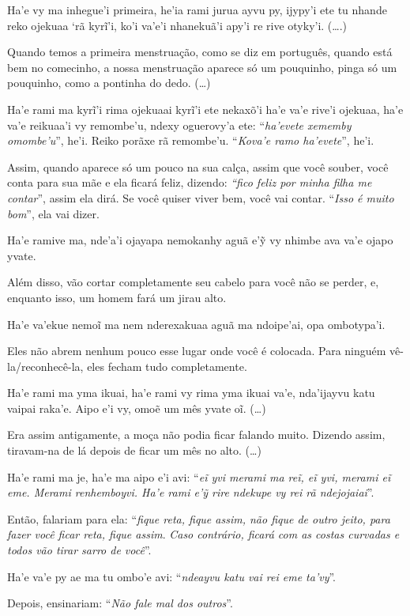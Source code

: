 \begin{paracol}{2}
\footnotesize
Ha’e vy ma inhegue’i primeira, he’ia rami jurua ayvu py, ijypy’i ete tu
nhande reko ojekuaa ‘rã kyrĩ’i, ko’i va’e’i nhanekuã’i apy’i re rive
otyky’i. (\ldots{}.)

\switchcolumn
Quando temos a primeira menstruação, como se diz em português, quando
está bem no comecinho, a nossa menstruação aparece só um pouquinho,
pinga só um pouquinho, como a pontinha do dedo. (\ldots{})

\switchcolumn
Ha'e rami ma kyrĩ'i rima ojekuaai kyrĩ'i ete nekaxõ'i ha'e va'e rive'i
ojekuaa, ha'e va'e reikuaa'i vy remombe'u, ndexy oguerovy'a ete:
``\emph{ha'evete xememby omombe'u}'', he'i. Reiko porãxe rã remombe'u.
``\emph{Kova'e ramo ha'evete}'', he'i.

\switchcolumn
Assim, quando aparece só um pouco na sua calça, assim que você souber,
você conta para sua mãe e ela ficará feliz, dizendo: \emph{``fico feliz
por minha filha me contar}'', assim ela dirá. Se você quiser viver bem,
você vai contar. ``\emph{Isso é muito bom}'', ela vai dizer.

\switchcolumn
Ha'e ramive ma, nde'a'i ojayapa nemokanhy aguã e'ỹ vy nhimbe ava va'e
ojapo yvate.

\switchcolumn
Além disso, vão cortar completamente seu cabelo para você não se perder,
e, enquanto isso, um homem fará um jirau alto. 

\switchcolumn
Ha’e va’ekue nemoĩ ma nem nderexakuaa aguã ma ndoipe’ai, opa
ombotypa’i. 

\switchcolumn
Eles não abrem nenhum pouco esse lugar onde você é colocada. Para
ninguém vê-la/reconhecê-la, eles fecham tudo completamente.

\switchcolumn
Ha’e rami ma yma ikuai, ha’e rami vy rima yma ikuai va’e, nda’ijayvu
katu vaipai raka’e.
Aipo e'i vy, omoẽ um mês yvate oĩ. (\ldots{})

\switchcolumn
Era assim antigamente, a moça não podia ficar falando muito. Dizendo
assim, tiravam-na de lá depois de ficar um mês no alto. (\ldots{})

\switchcolumn
Ha'e rami ma je, ha'e ma aipo e'i avi: ``\emph{eĩ yvi merami ma reĩ, eĩ
yvi, merami eĩ eme. Merami renhemboyvi. Ha'e rami e'ỹ rire ndekupe vy
rei rã ndejojaiai}''. 

\switchcolumn
Então, falariam para ela: ``\emph{fique reta, fique assim, não fique de
outro jeito, para fazer você ficar reta, fique assim}. \emph{Caso
contrário, ficará com as costas curvadas e todos vão tirar sarro de
você}''.

\switchcolumn
Ha'e va'e py ae ma tu ombo'e avi: ``\emph{ndeayvu katu vai rei eme
ta'vy}''.

\switchcolumn
Depois, ensinariam: ``\emph{Não fale mal dos outros}''.
\end{paracol}

